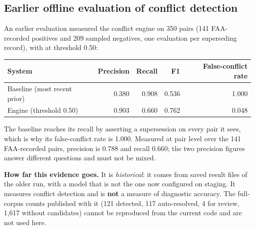 \subsection{Earlier offline evaluation of conflict detection}
An earlier evaluation measured the conflict engine on 350 pairs (141 FAA-recorded positives and 209 sampled negatives, one evaluation per superseding record), with  at threshold 0.50:
\begin{center}
\begin{tabular}{lrrrr}
\toprule \textbf{System} & \textbf{Precision} & \textbf{Recall} & \textbf{F1} & \textbf{False-conflict rate} \\ \midrule
Baseline (most recent prior) & 0.380 & 0.908 & 0.536 & 1.000 \\
Engine (threshold 0.50) & 0.903 & 0.660 & 0.762 & 0.048 \\
\bottomrule
\end{tabular}
\end{center}
The baseline reaches its recall by asserting a supersession on every pair it sees, which is why its false-conflict rate is 1.000. Measured at pair level over the 141 FAA-recorded pairs, precision is 0.788 and recall 0.660; the two precision figures answer different questions and must not be mixed.

\textbf{How far this evidence goes.} It is \emph{historical}: it comes from saved result files of the older run, with a model that is not the one now configured on staging. It measures conflict detection and is \textbf{not} a measure of diagnostic accuracy. The full-corpus counts published with it (121 detected, 117 auto-resolved, 4 for review, 1,617 without candidates) cannot be reproduced from the current code and are not used here.

